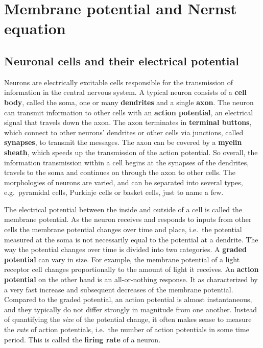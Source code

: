 \chapter{Membrane potential and Nernst equation}

\section{Neuronal cells and their electrical potential}

Neurons are electrically excitable cells responsible for the transmission of information in the central nervous system. A typical neuron consists of a \textbf{cell body}, called the soma, one or many \textbf{dendrites} and a single \textbf{axon}. The neuron can transmit information to other cells with an \textbf{action potential}, an electrical signal that travels down the axon. The axon terminates in \textbf{terminal buttons}, which connect to other neurons' dendrites or other cells via junctions, called \textbf{synapses}, to transmit the messages. The axon can be covered by a \textbf{myelin sheath}, which speeds up the transmission of the action potential. So overall, the information transmission within a cell begins at the synapses of the dendrites, travels to the soma and continues on through the axon to other cells. The morphologies of neurons are varied, and can be separated into several types, e.g.\ pyramidal cells, Purkinje cells or basket cells, just to name a few.

The electrical potential between the inside and outside of a cell is called the membrane potential. As the neuron receives and responds to inputs from other cells the membrane potential changes over time and place, i.e.\ the potential measured at the soma is not necessarily equal to the potential at a dendrite. The way the potential changes over time is divided into two categories. A \textbf{graded potential} can vary in size. For example, the membrane potential of a light receptor cell changes proportionally to the amount of light it receives. An \textbf{action potential} on the other hand is an all-or-nothing response. It as characterized by a very fast increase and subsequent decreases of the membrane potential. Compared to the graded potential, an action potential is almost instantaneous, and they typically do not differ strongly in magnitude from one another. Instead of quantifying the \textit{size} of the potential change, it often makes sense to measure the \textit{rate} of action potentials, i.e.\ the number of action potentials in some time period. This is called the \textbf{firing rate} of a neuron.

